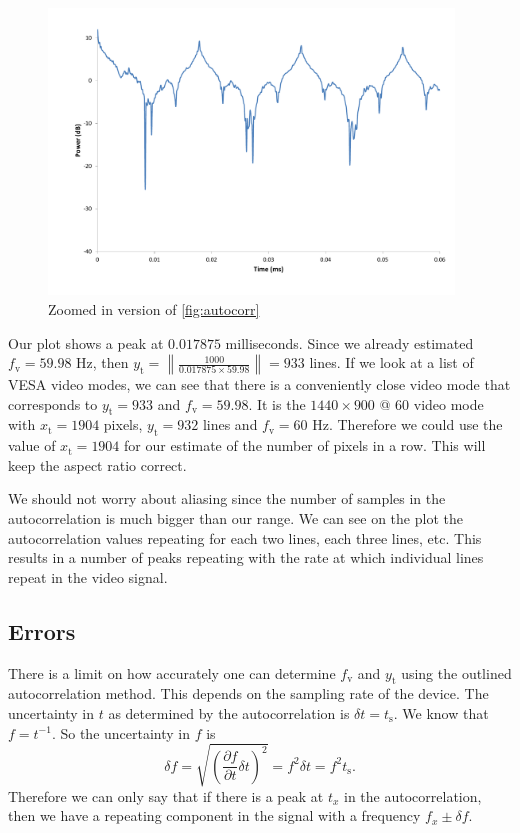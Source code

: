 \documentclass[a4paper,12pt,twoside,openright]{report}
\begin{document}
\begin{figure}[h]
\centering
  \includegraphics[width=0.96\textwidth]{autocorr_zoomed}
  \caption{Zoomed in version of \ref{fig:autocorr}}
  \label{fig:autocorr_zoomed}
\end{figure}

Our plot shows a peak at $0.017875$ milliseconds. Since we already estimated $f_\text{v} = 59.98$ Hz, then $y_\text{t} = \left\| \frac{1000}{0.017875 \times 59.98} \right\| = 933$ lines. If we look at a list of VESA video modes, we can see that there is a conveniently close video mode that corresponds to $y_\text{t} = 933$ and $f_\text{v} = 59.98$. It is the $1440 \times 900$ @ $60$ video mode with $x_\text{t} = 1904$ pixels, $y_\text{t} = 932$ lines and $f_\text{v}=60$ Hz. Therefore we could use the value of $x_\text{t} = 1904$ for our estimate of the number of pixels in a row. This will keep the aspect ratio correct.

We should not worry about aliasing since the number of samples in the autocorrelation is much bigger than our range. We can see on the plot the autocorrelation values repeating for each two lines, each three lines, etc. This results in a number of peaks repeating with the rate at which individual lines repeat in the video signal.

\subsection{Errors}

There is a limit on how accurately one can determine $f_\text{v}$ and $y_\text{t}$ using the outlined autocorrelation method. This depends on the sampling rate of the device. The uncertainty in $t$ as determined by the autocorrelation is $\delta t = t_\text{s}$. We know that $f = t^{-1}$. So the uncertainty in $f$ is 
$$\delta f = \sqrt{\left( \frac{\partial f}{\partial t} \delta t \right)^2} =  f^2 \delta t = f^2 t_\text{s}.$$
Therefore we can only say that if there is a peak at $t_{x}$ in the autocorrelation, then we have a repeating component in the signal with a frequency $f_{x} \pm \delta f$.
\end{document}

